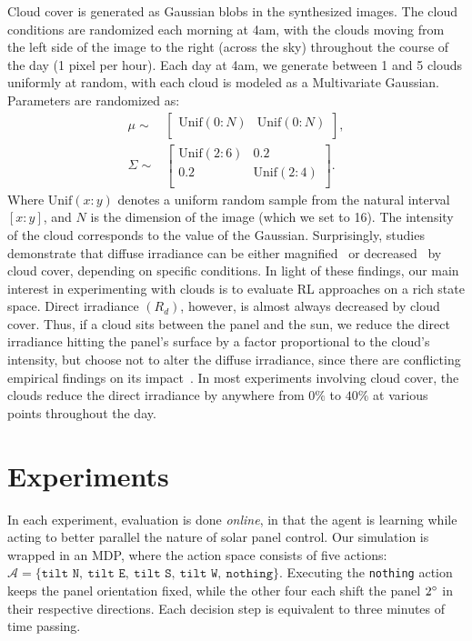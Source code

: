 \documentclass{article}
\newcommand{\mc}{\mathcal}
\begin{document}
{Cloud cover is generated as Gaussian blobs in the synthesized images. The cloud conditions are randomized each morning at 4am, with the clouds moving from the left side of the image to the right (across the sky) throughout the course of the day (1 pixel per hour). Each day at 4am, we generate between 1 and 5 clouds uniformly at random, with each cloud is modeled as a Multivariate Gaussian. Parameters are randomized as:
\begin{align*}
\mu \sim& \begin{bmatrix}
\text{Unif}(0:N)&  \text{Unif}(0:N) \\
\end{bmatrix}, \\
\Sigma \sim& \begin{bmatrix}
\text{Unif}(2:6)&0.2 \\
0.2&\text{Unif}(2:4) \\
\end{bmatrix}.
\end{align*}
Where $\text{Unif}(x:y)$ denotes a uniform random sample from the natural interval $[x:y]$, and $N$ is the dimension of the image (which we set to 16). The intensity of the cloud corresponds to the value of the Gaussian. Surprisingly, studies demonstrate that diffuse irradiance can be either magnified~\cite{robinson1966solar} or decreased~\cite{pfister2003cloud} by cloud cover, depending on specific conditions. In light of these findings, our main interest in experimenting with clouds is to evaluate RL approaches on a rich state space. Direct irradiance $(R_d)$, however, is almost always decreased by cloud cover. Thus, if a cloud sits between the panel and the sun, we reduce the direct irradiance hitting the panel's surface by a factor proportional to the cloud's intensity, but choose not to alter the diffuse irradiance, since there are conflicting empirical findings on its impact~\cite{robinson1966solar,pfister2003cloud}. In most experiments involving cloud cover, the clouds reduce the direct irradiance by anywhere from $0\%$ to $40\%$ at various points throughout the day. 



\section{Experiments}


In each experiment, evaluation is done {\it online}, in that the agent is learning while acting to better parallel the nature of solar panel control. Our simulation is wrapped in an MDP, where the action space consists of five actions: $\mc{A} = \{\texttt{tilt N},\ \texttt{tilt E},\ \texttt{tilt S},\ \texttt{tilt W},\ \texttt{nothing}\}$. Executing the \texttt{nothing} action keeps the panel orientation fixed, while the other four each shift the panel $2\degree$ in their respective directions. Each decision step is equivalent to three minutes of time passing.


}
\end{document}
